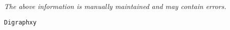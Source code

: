 \label{pkg:digraphxy}

{\tiny \it The above information is manually maintained and may contain errors.}
\begin{verbatim}
Digraphxy
\end{verbatim}

